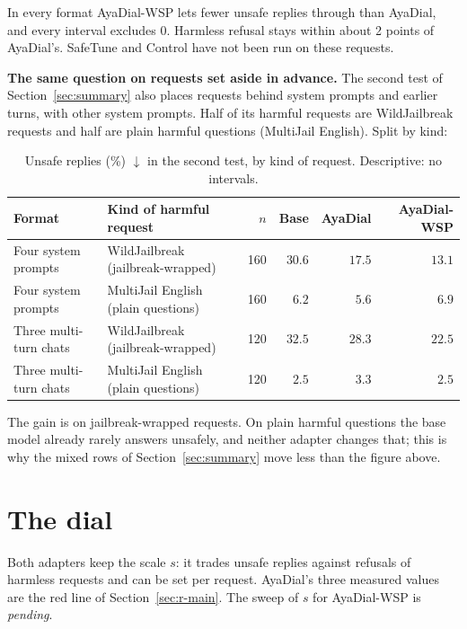 \documentclass[10pt,a4paper]{article}
\renewcommand{\arraystretch}{1.12}
\begin{document}
In every format AyaDial-WSP lets fewer unsafe replies through than AyaDial, and every interval excludes 0. Harmless refusal stays within about 2 points of AyaDial's. SafeTune and Control have not been run on these requests.

\textbf{The same question on requests set aside in advance.} The second test of Section~\ref{sec:summary} also places requests behind system prompts and earlier turns, with other system prompts. Half of its harmful requests are WildJailbreak requests and half are plain harmful questions (MultiJail English). Split by kind:

\begin{table}[H]\centering\small\renewcommand{\arraystretch}{1.3}\begin{tabular}{|l|l|r|r|r|r|}\hline
Format & Kind of harmful request & $n$ & Base & AyaDial & AyaDial-WSP\\\hline
Four system prompts & WildJailbreak (jailbreak-wrapped) & 160 & $30.6$ & $17.5$ & $13.1$\\\hline
Four system prompts & MultiJail English (plain questions) & 160 & $6.2$ & $5.6$ & $6.9$\\\hline
Three multi-turn chats & WildJailbreak (jailbreak-wrapped) & 120 & $32.5$ & $28.3$ & $22.5$\\\hline
Three multi-turn chats & MultiJail English (plain questions) & 120 & $2.5$ & $3.3$ & $2.5$\\\hline
\end{tabular}\caption{Unsafe replies (\%) $\downarrow$ in the second test, by kind of request. Descriptive: no intervals.}\end{table}
The gain is on jailbreak-wrapped requests. On plain harmful questions the base model already rarely answers unsafely, and neither adapter changes that; this is why the mixed rows of Section~\ref{sec:summary} move less than the figure above.
\section{The dial}\label{sec:r-cost}
Both adapters keep the scale $s$: it trades unsafe replies against refusals of harmless requests and can be set per request. AyaDial's three measured values are the red line of Section~\ref{sec:r-main}. The sweep of $s$ for AyaDial-WSP is \textit{pending}.
\end{document}
